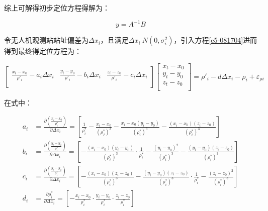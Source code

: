综上可解得初步定位方程得解为：

\begin{equation}
    y=A^{-1}B
\end{equation}

令无人机观测站站址偏差为$\Delta x_i$，且满足$\Delta x_i~N(0,\sigma_i^2)$，引入方程\eqref{e5-081704}进而得到最终得定位方程为：

\begin{equation}
\left[
    \begin{matrix}
        \frac{x_i-x_0}{\rho'_i} - a_i\Delta x_i     &   \frac{y_i-y_0}{\rho'_i} - b_i\Delta x_i     &   \frac{z_i-z_0}{\rho'_i} - c_i\Delta x_i \\
    \end{matrix}
\right]
\left[
    \begin{matrix}
        x_t - x_0   \\
        y_t - y_0   \\
        z_t - z_0   \\
    \end{matrix}
\right]
=
\rho'_i - d\Delta x_i - \rho_i + \varepsilon_{\rho i}
\end{equation}

在式中：

\begin{align}
    a_i 
    & = 
    \frac{\partial\left(\frac{x_i-x_0}{\rho_i^*}\right)}{\partial\Delta x_i}
    =
    \left[
        \frac{1}{\rho_i^*} - 
        \frac{x_i-x_0}{(\rho_I^*)^3} - 
        \frac{x_i-x_0(y_i-y_0)}{(\rho_i^*)^3} - 
        \frac{(x_i-x_0)(z_i-z_0)}{(\rho_i^*)^3}
    \right] \label{111819}\\
    b_i
    & =
    \frac{\partial\left(\frac{y_i-y_0}{\rho_i^*}\right)}{\partial\Delta x_i}
    =
    \left[
        -\frac{(x_i-x_0)(y_i-y_0)}{(\rho_i^*)^3}\cdot\frac{1}{\rho_i^*} -
        \frac{(y_i-y_0)^2}{(\rho_i^*)^3} -
        \frac{(y_i-y_0)(z_i-z_0)}{(\rho_i^*)^3}
    \right]\\
    c_i
    & =
    \frac{\partial\left(\frac{y_i-y_0}{\rho_i^*}\right)}{\partial\Delta x_i}
    =
    \left[
        -\frac{(x_i-x_0)(z_i-z_0)}{(\rho_i^*)^3} -
        \frac{(y_i-y_0)(z_i-z_0)}{(\rho_i^*)^3}\cdot\frac{1}{\rho_i^*} -
        \frac{(z_i-z_0)^2}{(\rho_i^*)^3}
    \right]\\
    d_i
    & =
    \frac{\partial\rho_i^*}{\partial\Delta x_i}
    =
    \left[
        - \frac{x_i-x_0}{\rho_i^*}\cdot
        \frac{y_i-y_0}{\rho_i^*}\cdot
        \frac{z_i-z_0}{\rho_i^*}
    \right] \label{111820}\\
\end{align}

